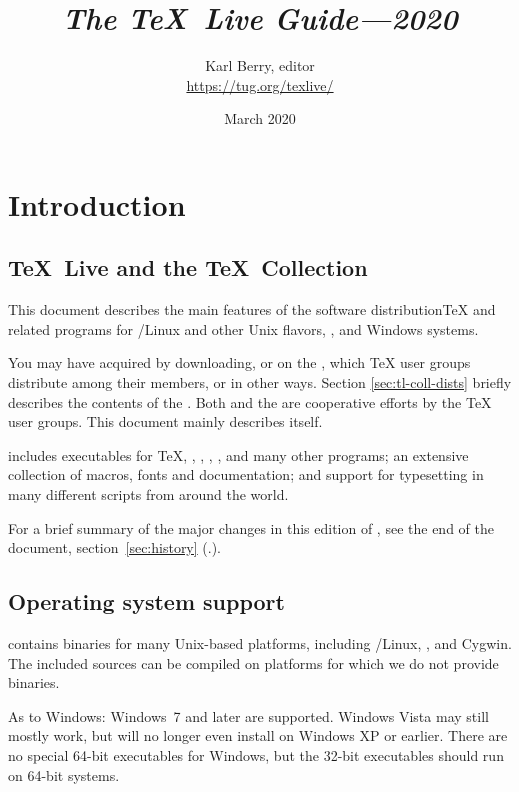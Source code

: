 \documentclass{article}
\title{%
  {\huge \textit{The \TeX\ Live Guide---2020}}
}
\author{Karl Berry, editor \\[3mm]
        \url{https://tug.org/texlive/}
       }
\date{March 2020}
\begin{document}
\maketitle

\begin{multicols}{2}
\tableofcontents
\end{multicols}

\section{Introduction}
\label{sec:intro}

\subsection{\protect\TeX\protect\ Live and the \protect\TeX\protect\ Collection}

This document describes the main features of the \TL{} software
distribution\Dash \TeX{} and related programs for \GNU/Linux
and other Unix flavors, \MacOSX, and Windows systems.

You may have acquired \TL{} by downloading, or on the \TK{} \DVD, which
\TeX{} user groups distribute among their members, or in other ways.
Section \ref{sec:tl-coll-dists} briefly describes the contents of the
\DVD.  Both \TL{} and the \TK{} are cooperative efforts by the \TeX{}
user groups. This document mainly describes \TL{} itself.

\TL{} includes executables for \TeX{}, \LaTeXe{}, \ConTeXt,
\MF, \MP, \BibTeX{} and many other programs; an extensive collection
of macros, fonts and documentation; and support for typesetting in
many different scripts from around the world.

For a brief summary of the major changes in this edition of \TL{},
see the end of the document, section~\ref{sec:history}
(\p.\pageref{sec:history}).


\subsection{Operating system support}
\label{sec:os-support}

\TL{} contains binaries for many Unix-based platforms, including
\GNU/Linux, \MacOSX, and Cygwin.  The included sources can be compiled
on platforms for which we do not provide binaries.

As to Windows: Windows~7 and later are supported. Windows Vista
may still mostly work, but \TL{} will no longer even install on Windows
XP or earlier.  There are no special
64-bit executables for Windows, but the 32-bit executables should
run on 64-bit systems.
\end{document}
